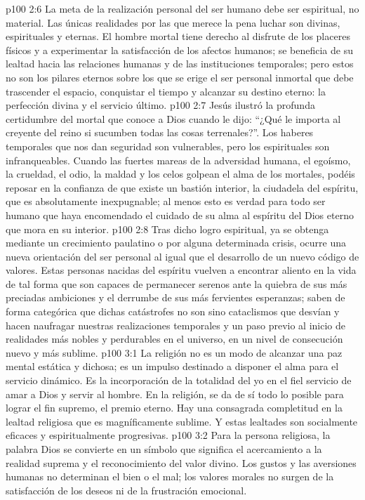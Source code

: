 \vs p100 2:6 \pc La meta de la realización personal del ser humano debe ser espiritual, no material. Las únicas realidades por las que merece la pena luchar son divinas, espirituales y eternas. El hombre mortal tiene derecho al disfrute de los placeres físicos y a experimentar la satisfacción de los afectos humanos; se beneficia de su lealtad hacia las relaciones humanas y de las instituciones temporales; pero estos no son los pilares eternos sobre los que se erige el ser personal inmortal que debe trascender el espacio, conquistar el tiempo y alcanzar su destino eterno: la perfección divina y el servicio último.
\vs p100 2:7 Jesús ilustró la profunda certidumbre del mortal que conoce a Dios cuando le dijo: “¿Qué le importa al creyente del reino si sucumben todas las cosas terrenales?”. Los haberes temporales que nos dan seguridad son vulnerables, pero los espirituales son infranqueables. Cuando las fuertes mareas de la adversidad humana, el egoísmo, la crueldad, el odio, la maldad y los celos golpean el alma de los mortales, podéis reposar en la confianza de que existe un bastión interior, la ciudadela del espíritu, que es absolutamente inexpugnable; al menos esto es verdad para todo ser humano que haya encomendado el cuidado de su alma al espíritu del Dios eterno que mora en su interior.
\vs p100 2:8 Tras dicho logro espiritual, ya se obtenga mediante un crecimiento paulatino o por alguna determinada crisis, ocurre una nueva orientación del ser personal al igual que el desarrollo de un nuevo código de valores. Estas personas nacidas del espíritu vuelven a encontrar aliento en la vida de tal forma que son capaces de permanecer serenos ante la quiebra de sus más preciadas ambiciones y el derrumbe de sus más fervientes esperanzas; saben de forma categórica que dichas catástrofes no son sino cataclismos que desvían y hacen naufragar nuestras realizaciones temporales y un paso previo al inicio de realidades más nobles y perdurables en el universo, en un nivel de consecución nuevo y más sublime.
\vs p100 3:1 La religión no es un modo de alcanzar una paz mental estática y dichosa; es un impulso destinado a disponer el alma para el servicio dinámico. Es la incorporación de la totalidad del yo en el fiel servicio de amar a Dios y servir al hombre. En la religión, se da de sí todo lo posible para lograr el fin supremo, el premio eterno. Hay una consagrada completitud en la lealtad religiosa que es magníficamente sublime. Y estas lealtades son socialmente eficaces y espiritualmente progresivas.
\vs p100 3:2 Para la persona religiosa, la palabra Dios se convierte en un símbolo que significa el acercamiento a la realidad suprema y el reconocimiento del valor divino. Los gustos y las aversiones humanas no determinan el bien o el mal; los valores morales no surgen de la satisfacción de los deseos ni de la frustración emocional.
